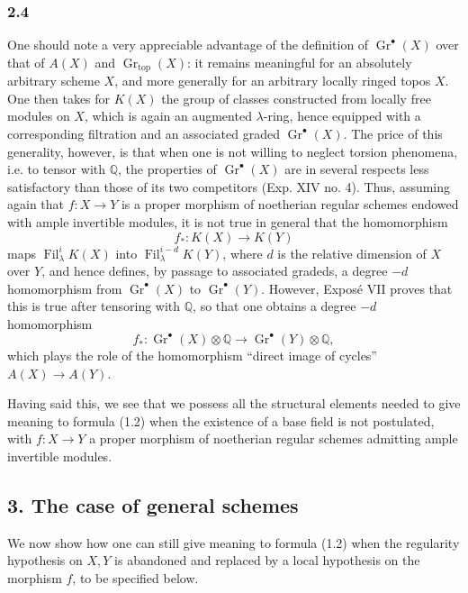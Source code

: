 \documentclass[11pt]{article}
\newcommand{\Gr}{\operatorname{Gr}}
\newcommand{\Fil}{\operatorname{Fil}}
\begin{document}
\subsubsection*{2.4}
One should note a very appreciable advantage of the definition of $\Gr^\bullet(X)$ over that of $A(X)$ and $\Gr_{\mathrm{top}}(X)$: it remains meaningful for an absolutely arbitrary scheme $X$, and more generally for an arbitrary locally ringed topos $X$. One then takes for $K(X)$ the group of classes constructed from locally free modules on $X$, which is again an augmented $\lambda$-ring, hence equipped with a corresponding filtration and an associated graded $\Gr^\bullet(X)$. The price of this generality, however, is that when one is not willing to neglect torsion phenomena, i.e. to tensor with $\mathbb Q$, the properties of $\Gr^\bullet(X)$ are in several respects less satisfactory than those of its two competitors (Exp. XIV no. 4). Thus, assuming again that $f:X\to Y$ is a proper morphism of noetherian regular schemes endowed with ample invertible modules, it is not true in general that the homomorphism
\[
f_*:K(X)\longrightarrow K(Y)
\]
maps $\Fil^i_\lambda K(X)$ into $\Fil^{i-d}_\lambda K(Y)$, where $d$ is the relative dimension of $X$ over $Y$, and hence defines, by passage to associated gradeds, a degree $-d$ homomorphism from $\Gr^\bullet(X)$ to $\Gr^\bullet(Y)$. However, Exposé VII proves that this is true after tensoring with $\mathbb Q$, so that one obtains a degree $-d$ homomorphism
\begin{equation}\tag{2.5}
f_*:\Gr^\bullet(X)\otimes\mathbb Q\longrightarrow \Gr^\bullet(Y)\otimes\mathbb Q,
\end{equation}
which plays the role of the homomorphism ``direct image of cycles'' $A(X)\to A(Y)$.

Having said this, we see that we possess all the structural elements needed to give meaning to formula (1.2) when the existence of a base field is not postulated, with $f:X\to Y$ a proper morphism of noetherian regular schemes admitting ample invertible modules.

\subsection*{3. The case of general schemes}
We now show how one can still give meaning to formula (1.2) when the regularity hypothesis on $X,Y$ is abandoned and replaced by a local hypothesis on the morphism $f$, to be specified below.
\end{document}

